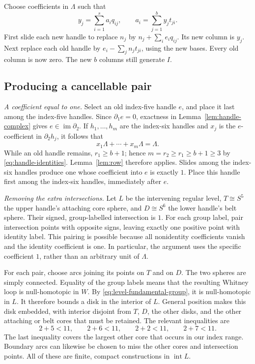 Choose coefficients in $\Lambda$ such that
\[
 y_j=\sum_{i=1}^s a_iq_{ij},
 \qquad
 a_i=\sum_{j=1}^b y_jt_{ji}.
\]
First slide each new handle to replace $n_j$ by
$n_j+\sum_i e_iq_{ij}$.  Its new column is $y_j$.
Next replace each old handle by $e_i-\sum_j n_jt_{ji}$, using the
new bases.  Every old column is now zero.  The new $b$ columns still
generate $I$.

\subsection{Producing a cancellable pair}

\noindent\emph{A coefficient equal to one.}
Select an old index-five handle $e$, and place it last among the
index-five handles.  Since $\partial_1e=0$, exactness in
Lemma~\ref{lem:handle-complex} gives $e\in\operatorname{im}\partial_2$.
If $h_1,\ldots,h_m$ are the index-six handles and $x_j$ is the
$e$-coefficient in $\partial_2h_j$, it follows that
\[
 x_1\Lambda+\cdots+x_m\Lambda=\Lambda.
\]
While an old handle remains, $r_1\geq b+1$; hence
$m=r_2\geq r_1\geq b+1\geq3$ by \eqref{eq:handle-identities}.
Lemma~\ref{lem:row} therefore applies.  Slides among the index-six
handles produce one whose coefficient into $e$ is exactly $1$.
Place this handle first among the index-six handles, immediately
after $e$.

\smallskip
\noindent\emph{Removing the extra intersections.}
Let $L$ be the intervening regular level, $T\cong S^5$ the upper
handle's attaching core sphere, and $D\cong S^6$ the lower handle's
belt sphere.  Their signed, group-labelled intersection is $1$.
For each group label, pair intersection points with opposite signs,
leaving exactly one positive point with identity label.  This pairing
is possible because all nonidentity coefficients vanish and the
identity coefficient is one.  In particular, the argument uses the
specific coefficient $1$, rather than an arbitrary unit of $\Lambda$.

For each pair, choose arcs joining its points on $T$ and on $D$.
The two spheres are simply connected.  Equality of the group labels
means that the resulting Whitney loop is null-homotopic in $W$.
By \eqref{eq:level-fundamental-group}, it is null-homotopic in $L$.
It therefore bounds a disk in the interior of $L$.  General position
makes this disk embedded, with interior disjoint from $T$, $D$,
the other disks, and the other attaching or belt cores that must be
retained.  The relevant inequalities are
\[
 2+5<11,\qquad 2+6<11,\qquad 2+2<11,
 \qquad 2+7<11.
\]
The last inequality covers the largest other core that occurs in
our index range.  Boundary arcs can likewise be chosen to miss the
other cores and intersection points.  All of these are finite,
compact constructions in $\operatorname{int}L$.

